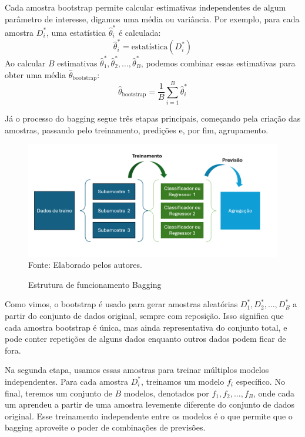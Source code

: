\documentclass[a4paper,12pt]{article}[abntex2]
\begin{document}
Cada amostra bootstrap permite calcular estimativas independentes de algum parâmetro de interesse, digamos uma média ou variância. Por exemplo, para cada amostra \( D_i^{*} \), uma estatística \( \hat{\theta}_i^{*} \) é calculada:
\[
\hat{\theta}_i^{*} = \text{estatística}(D_i^{*})
\]
Ao calcular \( B \) estimativas \( \hat{\theta}_1^{*}, \hat{\theta}_2^{*}, \ldots, \hat{\theta}_B^{*} \), podemos combinar essas estimativas para obter uma média \( \hat{\theta}_{\text{bootstrap}} \):
\[
\hat{\theta}_{\text{bootstrap}} = \frac{1}{B} \sum_{i=1}^{B} \hat{\theta}_i^{*}
\]

Já o processo do bagging segue três etapas principais, começando pela criação das amostras, passando pelo treinamento, predições e, por fim, agrupamento.

\begin{figure}[H]
    \centering
    \caption{Estrutura de funcionamento Bagging} 
    \includegraphics[width=1.0\textwidth]{APS/q2_fig2.png}
    \label{q2_fig2} 
    \footnotesize{Fonte: Elaborado pelos autores.}
\end{figure}

Como vimos, o bootstrap é usado para gerar amostras aleatórias \( D_1^{*}, D_2^{*}, \ldots, D_B^{*} \) a partir do conjunto de dados original, sempre com reposição. Isso significa que cada amostra bootstrap é única, mas ainda representativa do conjunto total, e pode conter repetições de alguns dados enquanto outros dados podem ficar de fora. 

Na segunda etapa, usamos essas amostras para treinar múltiplos modelos independentes. Para cada amostra \( D_i^{*} \), treinamos um modelo \( f_i \) específico. No final, teremos um conjunto de \( B \) modelos, denotados por \( f_1, f_2, \ldots, f_B \), onde cada um aprendeu a partir de uma amostra levemente diferente do conjunto de dados original. Esse treinamento independente entre os modelos é o que permite que o bagging aproveite o poder de combinações de previsões.
\end{document}

